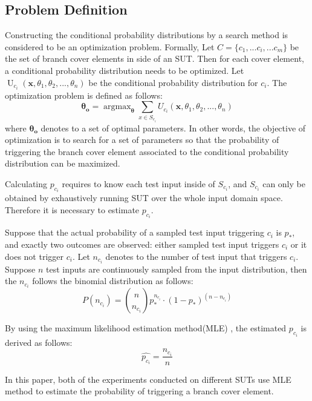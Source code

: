 \documentclass[journal]{IEEEtran}
\renewcommand{\vec}[1]{\mathbf{#1}}
\begin{document}
\subsection{Problem Definition}
Constructing the conditional probability distributions by a search method is considered to be an optimization problem. Formally, Let \(C=\{c_{1},...c_{i},...c_{m}\}\) be the set of branch cover elements in side of an SUT. Then for each cover element, a conditional probability distribution needs to be optimized. Let  \(\mathop{U}_{c_{i}}(\vec{x},\theta_{1},\theta_{2},...,\theta_{n})\) be the conditional probability distribution for \(c_{i}\). The optimization problem is defined as follows:
\[\vec{\theta_o} = \mathop{\arg\max}_{\vec{\theta}}\sum_{x \in S_{c_i}} U_{c_{i}}(\vec{x},\theta_{1},\theta_{2},...,\theta_{n}) \]
where \(\vec{\theta_o}\) denotes to a set of optimal parameters. In other words, the objective of optimization is to search for a set of parameters so that the probability of triggering the branch cover element associated to the conditional probability distribution can be maximized.

Calculating \(p_{c_{i}}\) requires to know each test input inside of \(S_{c_{i}}\), and \(S_{c_{i}}\) can only be obtained by exhaustively running SUT over the whole input domain space. Therefore it is necessary to estimate \(p_{c_i}\).

Suppose that the actual probability of a sampled test input triggering \(c_{i}\) is \(p_{*}\), and exactly two outcomes are observed: either sampled test input triggers \(c_{i}\) or it does not trigger \(c_{i}\).
Let \(n_{c_{i}}\) denotes to the number of test input that triggers \(c_{i}\). Suppose \(n\) test inputs are continuously sampled from the input distribution, then the \(n_{c_{i}}\) follows the binomial distribution as follows: 
\[P(n_{c_{i}}) = \binom{n}{n_{c_{i}}}p_{*}^{n_{c_{i}}}\cdot (1-p_{*})^{(n-n_{c_{i}})} \]

By using the maximum likelihood estimation method(MLE) \cite{mle}, the estimated \(p_{c_{i}}\) is derived as follows:
\[ \label{eq:estp}
\tag{5}
\hat{p_{c_i}} = \frac{n_{c_i}}{n}\]

In this paper, both of the experiments conducted on different SUTs use MLE method to estimate the probability of triggering a branch cover element.
\end{document}
